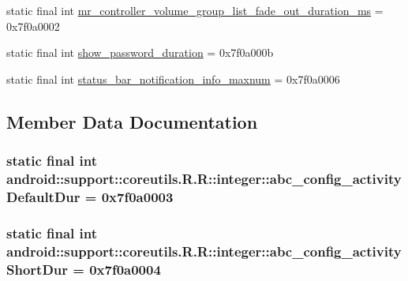 \begin{CompactItemize}
\item 
static final int \hyperlink{classandroid_1_1support_1_1coreutils_1_1_r_1_1integer_87c7816b67dff284790ff63b3b79c1f6}{mr\_\-controller\_\-volume\_\-group\_\-list\_\-fade\_\-out\_\-duration\_\-ms} = 0x7f0a0002
\item 
static final int \hyperlink{classandroid_1_1support_1_1coreutils_1_1_r_1_1integer_fd283d99cd17725ca75f4daefda58702}{show\_\-password\_\-duration} = 0x7f0a000b
\item 
static final int \hyperlink{classandroid_1_1support_1_1coreutils_1_1_r_1_1integer_18694a863f933045eab121322f7b3781}{status\_\-bar\_\-notification\_\-info\_\-maxnum} = 0x7f0a0006
\end{CompactItemize}


\subsection{Member Data Documentation}
\hypertarget{classandroid_1_1support_1_1coreutils_1_1_r_1_1integer_3682dac5df21b24ee0b4a19de45d340b}{
\subsubsection[{abc\_\-config\_\-activityDefaultDur}]{\setlength{\rightskip}{0pt plus 5cm}static final int android::support::coreutils.R.R::integer::abc\_\-config\_\-activityDefaultDur = 0x7f0a0003}}
\label{classandroid_1_1support_1_1coreutils_1_1_r_1_1integer_3682dac5df21b24ee0b4a19de45d340b}


\hypertarget{classandroid_1_1support_1_1coreutils_1_1_r_1_1integer_354a09776f4a0b8ec48017d07c6ae6dc}{
\subsubsection[{abc\_\-config\_\-activityShortDur}]{\setlength{\rightskip}{0pt plus 5cm}static final int android::support::coreutils.R.R::integer::abc\_\-config\_\-activityShortDur = 0x7f0a0004}}
\label{classandroid_1_1support_1_1coreutils_1_1_r_1_1integer_354a09776f4a0b8ec48017d07c6ae6dc}


